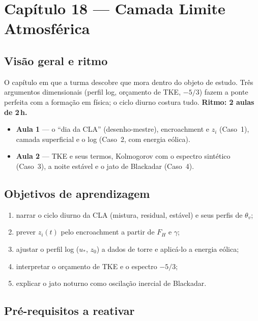 \section{Capítulo 18 --- Camada Limite Atmosférica}

\subsection*{Visão geral e ritmo}

O capítulo em que a turma descobre que mora dentro do objeto de
estudo. Três argumentos dimensionais (perfil log, orçamento de TKE,
$-5/3$) fazem a ponte perfeita com a formação em física; o ciclo
diurno costura tudo. \textbf{Ritmo: 2 aulas de 2\,h.}

\begin{itemize}
  \item \textbf{Aula 1} — o ``dia da CLA'' (desenho-mestre),
        encroachment e $z_i$ (Caso~1), camada superficial e o log
        (Caso~2, com energia eólica).
  \item \textbf{Aula 2} — TKE e seus termos, Kolmogorov com o
        espectro sintético (Caso~3), a noite estável e o jato de
        Blackadar (Caso~4).
\end{itemize}

\subsection*{Objetivos de aprendizagem}

\begin{enumerate}
  \item narrar o ciclo diurno da CLA (mistura, residual, estável) e
        seus perfis de $\theta_v$;
  \item prever $z_i(t)$ pelo encroachment a partir de $F_H$ e
        $\gamma$;
  \item ajustar o perfil log ($u_*$, $z_0$) a dados de torre e
        aplicá-lo a energia eólica;
  \item interpretar o orçamento de TKE e o espectro $-5/3$;
  \item explicar o jato noturno como oscilação inercial de Blackadar.
\end{enumerate}

\subsection*{Pré-requisitos a reativar}

